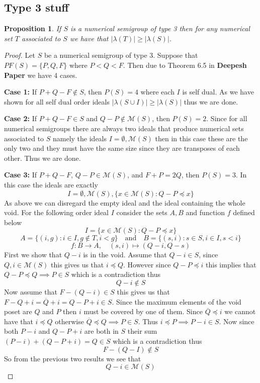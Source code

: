 \documentclass[11pt,letterpaper]{article}
\newtheorem{prop}[thm]{Proposition}
\theoremstyle{definition}
\begin{document}
\newpage

\begin{center}
    \section{Type 3 stuff}
\end{center}




\begin{prop}
    If $S$ is a numerical semigroup of type 3 then for any numerical set $T$ associated to $S$ we have that $|\lambda(T)|\geq |\lambda(S)|$.
\end{prop}

\begin{proof}
    Let $S$ be a numerical semigroup of type 3. Suppose that $PF(S)=\{P,Q,F\}$ where $P<Q<F$. Then due to Theorem 6.5 in \textbf{Deepesh Paper} we have 4 cases.

    \textbf{Case 1:} If $P+Q-F\notin S$, then $P(S)=4$ where each $I$ is self dual. As we have shown for all self dual order ideals $|\lambda(S\cup I)|\geq |\lambda(S)|$ thus we are done.

    \textbf{Case 2:} If $P+Q-F\in S$ and $Q-P\notin\mathcal{M}(S)$, then $P(S)=2$. Since for all numerical semigroups there are always two ideals that produce numerical sets associated to $S$ namely the ideals $I=\emptyset,\mathcal{M}(S)$ then in this case these are the only two and they must have the same size since they are transposes of each other. Thus we are done.

    \textbf{Case 3:} If $P+Q-F$, $Q-P\in\mathcal{M}(S)$, and $F+P=2Q$, then $P(S)=3$. In this case the ideals are exactly 
    \[I=\emptyset, \mathcal{M}(S), \{x\in\mathcal{M}(S):Q-P\preccurlyeq x\}\]
    As above we can disregard the empty ideal and the ideal containing the whole void. For the following order ideal $I$ consider the sets $A,B$ and function $f$ defined below
    \[I=\{x\in\mathcal{M}(S):Q-P\preccurlyeq x\}\]
    \[A=\{(i,g):i\in I,g\notin T, i<g\} \quad\text{and}\quad B=\{(s,i):s\in S,i\in I,s<i\}\]
    \[f:B\rightarrow A, \quad (s,i)\mapsto (Q-i,Q-s)\]
    First we show that $Q-i$ is in the void. Assume that $Q-i\in S$, since $Q,i\in\mathcal{M}(S)$ this gives us that $i\preccurlyeq Q$. However since $Q-P\preccurlyeq i$ this implies that $Q-P\preccurlyeq Q\implies P\in S$ which is a contradiction thus \[Q-i\notin S\] Now assume that $F-(Q-i)\in S$ this gives us that $F-Q+i=\overline{Q}+i=Q-P+i\in S$. Since the maximum elements of the void poset are $Q$ and $P$ then $i$ must be covered by one of them. Since $\overline{Q}\preccurlyeq i$ we cannot have that $i\preccurlyeq Q$ otherwise $\overline{Q}\preccurlyeq Q\implies P\in S$. Thus $i\preccurlyeq P\implies P-i\in S$. Now since both $P-i$ and $Q-P+i$ are both in $S$ their sum $(P-i)+(Q-P+i)=Q\in S$ which is a contradiction thus 
    \[F-(Q-I)\notin S\]
    So from the previous two results we see that 
    \[Q-i\in\mathcal{M}(S)\]
    

\end{proof}
\end{document}
